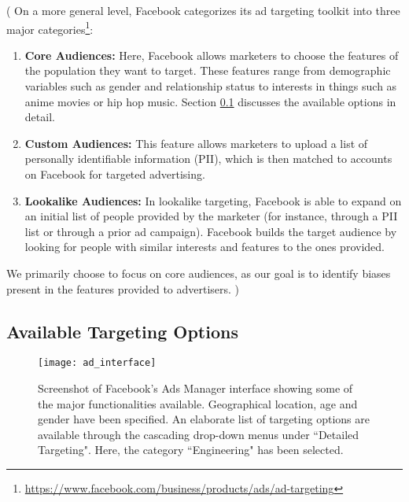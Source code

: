 \if(
On a more general level, Facebook categorizes its ad targeting toolkit into three major categories\footnote{\url{https://www.facebook.com/business/products/ads/ad-targeting}}:

\begin{enumerate}
\item \textbf{Core Audiences:} Here, Facebook allows marketers to choose the features of the population they want to target. These features range from demographic variables such as gender and relationship status to interests in things such as anime movies or hip hop music. Section \ref{subsec:targeting_options} discusses the available options in detail.

\item \textbf{Custom Audiences:} This feature allows marketers to upload a list of personally identifiable information (PII), which is then matched to accounts on Facebook for targeted advertising.

\item \textbf{Lookalike Audiences:} In lookalike targeting, Facebook is able to expand on an initial list of people provided by the marketer (for instance, through a PII list or through a prior ad campaign). Facebook builds the target audience by looking for people with similar interests and features to the ones provided.
\end{enumerate}

We primarily choose to focus on core audiences, as our goal is to identify biases present in the features provided to advertisers.
)\fi

\subsection{Available Targeting Options} \label{subsec:targeting_options}

\begin{figure}

\centering
\texttt{[image: ad\_interface]}
\caption{Screenshot of Facebook's Ads Manager interface showing some of the major functionalities available. Geographical location, age and gender have been specified. An elaborate list of targeting options are available through the cascading drop-down menus under ``Detailed Targeting". Here, the category ``Engineering" has been selected.}
\label{fig:ad_interface}

\end{figure}

